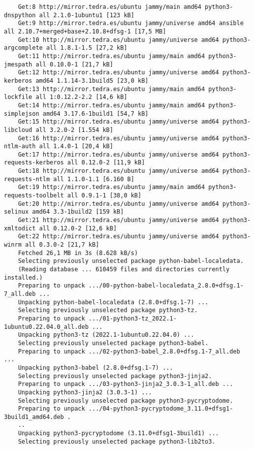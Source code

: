 \documentclass[../main.tex]{subfiles}
\begin{document}
\begin{lstlisting}
	Get:8 http://mirror.tedra.es/ubuntu jammy/main amd64 python3-dnspython all 2.1.0-1ubuntu1 [123 kB]
	Get:9 http://mirror.tedra.es/ubuntu jammy/universe amd64 ansible all 2.10.7+merged+base+2.10.8+dfsg-1 [17,5 MB]
	Get:10 http://mirror.tedra.es/ubuntu jammy/universe amd64 python3-argcomplete all 1.8.1-1.5 [27,2 kB]
	Get:11 http://mirror.tedra.es/ubuntu jammy/main amd64 python3-jmespath all 0.10.0-1 [21,7 kB]
	Get:12 http://mirror.tedra.es/ubuntu jammy/universe amd64 python3-kerberos amd64 1.1.14-3.1build5 [23,0 kB]
	Get:13 http://mirror.tedra.es/ubuntu jammy/main amd64 python3-lockfile all 1:0.12.2-2.2 [14,6 kB]
	Get:14 http://mirror.tedra.es/ubuntu jammy/main amd64 python3-simplejson amd64 3.17.6-1build1 [54,7 kB]
	Get:15 http://mirror.tedra.es/ubuntu jammy/universe amd64 python3-libcloud all 3.2.0-2 [1.554 kB]
	Get:16 http://mirror.tedra.es/ubuntu jammy/universe amd64 python3-ntlm-auth all 1.4.0-1 [20,4 kB]
	Get:17 http://mirror.tedra.es/ubuntu jammy/universe amd64 python3-requests-kerberos all 0.12.0-2 [11,9 kB]
	Get:18 http://mirror.tedra.es/ubuntu jammy/universe amd64 python3-requests-ntlm all 1.1.0-1.1 [6.160 B]
	Get:19 http://mirror.tedra.es/ubuntu jammy/main amd64 python3-requests-toolbelt all 0.9.1-1 [38,0 kB]
	Get:20 http://mirror.tedra.es/ubuntu jammy/universe amd64 python3-selinux amd64 3.3-1build2 [159 kB]
	Get:21 http://mirror.tedra.es/ubuntu jammy/universe amd64 python3-xmltodict all 0.12.0-2 [12,6 kB]
	Get:22 http://mirror.tedra.es/ubuntu jammy/universe amd64 python3-winrm all 0.3.0-2 [21,7 kB]
	Fetched 26,1 MB in 3s (8.628 kB/s)   
	Selecting previously unselected package python-babel-localedata.
	(Reading database ... 610459 files and directories currently installed.)
	Preparing to unpack .../00-python-babel-localedata_2.8.0+dfsg.1-7_all.deb ...
	Unpacking python-babel-localedata (2.8.0+dfsg.1-7) ...
	Selecting previously unselected package python3-tz.
	Preparing to unpack .../01-python3-tz_2022.1-1ubuntu0.22.04.0_all.deb ...
	Unpacking python3-tz (2022.1-1ubuntu0.22.04.0) ...
	Selecting previously unselected package python3-babel.
	Preparing to unpack .../02-python3-babel_2.8.0+dfsg.1-7_all.deb ...
	Unpacking python3-babel (2.8.0+dfsg.1-7) ...
	Selecting previously unselected package python3-jinja2.
	Preparing to unpack .../03-python3-jinja2_3.0.3-1_all.deb ...
	Unpacking python3-jinja2 (3.0.3-1) ...
	Selecting previously unselected package python3-pycryptodome.
	Preparing to unpack .../04-python3-pycryptodome_3.11.0+dfsg1-3build1_amd64.deb .
	..
	Unpacking python3-pycryptodome (3.11.0+dfsg1-3build1) ...
	Selecting previously unselected package python3-lib2to3.

\end{lstlisting}
\end{document}

